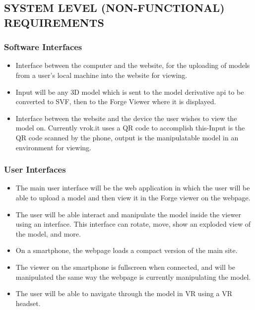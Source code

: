 \documentclass[letterpaper, 10pt, draftclsnofoot, compsoc, onecolumn]{IEEEtran}
\begin{document}
\subsection{SYSTEM LEVEL (NON-FUNCTIONAL) REQUIREMENTS}

\subsubsection{Software Interfaces}
	\begin{itemize}
		\item Interface between the computer and the website, for the uploading of models from a user's local machine into the 
	website for viewing. 
	
		\item Input will be any 3D model which is sent to the model derivative api to be converted to SVF, then to the Forge Viewer where it is displayed.

	
		\item Interface between the website and the device the user wishes to view the model on. Currently vrok.it uses a QR code to accomplish this-Input is the QR code scanned by the phone, output is the manipulatable model in an environment 
	for viewing. 
	\end{itemize}
	

\subsubsection{User Interfaces}

	\begin{itemize}
		\item The main user interface will be the web application in which the user will be able to upload a  model and then view it in the Forge viewer on the  webpage. 
		\item The user will be able interact and manipulate the model inside the viewer using an interface. This interface can rotate, move, show an exploded view of the model, and more.
		\item On a smartphone, the webpage loads a compact version of the main site. 
		\item The viewer on the smartphone is fullscreen when connected, and will be manipulated the same way the webpage is currently manipulating the model.
		\item The user will be able to navigate through the model in VR using a VR headset.
	\end{itemize}
\end{document}
